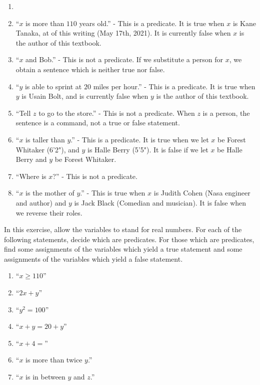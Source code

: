\begin{solutions}
	
	
	\begin{enumerate}
		\item[] \mbox{}
		\item ``$x$ is more than $110$ years old.'' - This is a predicate.  It is true when $x$ is Kane Tanaka, at of this writing (May 17th, 2021).  It is currently false when $x$ is the author of this textbook.
		\item ``$x$ and Bob.'' - This is not a predicate.  If we substitute a person for $x$, we obtain a sentence which is neither true nor false.
		\item ``$y$ is able to sprint at $20$ miles per hour.'' - This is a predicate.  It is true when $y$ is Usain Bolt, and is currently false when $y$ is the author of this textbook.
		\item ``Tell $z$ to go to the store.'' - This is not a predicate.  When $z$ is a person, the sentence is a command, not a true or false statement. 
		\item ``$x$ is taller than $y$.'' - This is a predicate.  It is true when we let $x$ be Forest Whitaker (6'2"), and $y$ is Halle Berry (5'5").  It is false if we let $x$ be Halle Berry and $y$ be Forest Whitaker.
		\item ``Where is $x$?'' - This is not a predicate.
		\item ``$x$ is the mother of $y$.'' - This is true when $x$ is Judith Cohen (Nasa engineer and author) and $y$ is Jack Black (Comedian and musician).  It is false when we reverse their roles.
	\end{enumerate}
	
\end{solutions}

\begin{xca}	
	In this exercise, allow the variables to stand for real numbers. For each of the following statements, decide which are predicates. For those which are  predicates, find some assignments of the variables which yield a true statement and some assignments of the variables which yield a false statement.
	
	\begin{enumerate}
		\item ``$x \geq 110$''
		\item ``$2x+y$''
		\item ``$y^2  = 100$''
		\item ``$x + y = 20 + y$''
		\item ``$x+4 = $''
		\item ``$x$ is more than twice $y$.''
		\item ``$x$ is in between $y$ and $z$.''
	\end{enumerate}
\end{xca}


